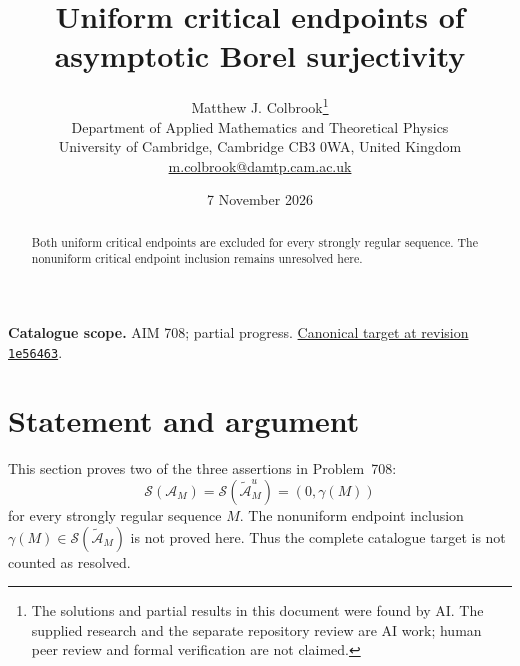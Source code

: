 \documentclass[11pt,a4paper]{article}
\theoremstyle{remark}
\begin{document}
\title{Uniform critical endpoints of asymptotic Borel surjectivity}
\author{Matthew J. Colbrook\thanks{The solutions and partial results in this document were found by AI. The supplied research and the separate repository review are AI work; human peer review and formal verification are not claimed.}\\[4pt]
\small Department of Applied Mathematics and Theoretical Physics\\
\small University of Cambridge, Cambridge CB3 0WA, United Kingdom\\
\small\href{mailto:m.colbrook@damtp.cam.ac.uk}{m.colbrook@damtp.cam.ac.uk}}
\date{7 November 2026}
\maketitle
\begin{abstract}
Both uniform critical endpoints are excluded for every strongly regular sequence. The nonuniform critical endpoint inclusion remains unresolved here.
\end{abstract}
\noindent\textbf{Catalogue scope.} AIM 708; partial progress. \href{https://github.com/MColbrook/AIM/blob/1e564633494c109edfd3ec46da1366adcff925a5/problems/708-the-critical-opening-for-asymptotic-borel-surjectivity.md}{Canonical target at revision \texttt{1e56463}}.


\section{Statement and argument}
\label{sec:708}

This section proves two of the three assertions in Problem~708:
\begin{equation}
 \mathcal S(\mathcal A_M)
 =\mathcal S(\widetilde{\mathcal A}^{u}_M)
 =(0,\gamma(M))
 \label{eq:708-1}
\end{equation}
for every strongly regular sequence $M$.
The nonuniform endpoint inclusion
$\gamma(M)\in\mathcal S(\widetilde{\mathcal A}_M)$ is not proved here.
Thus the complete catalogue target is not counted as resolved.
\end{document}
